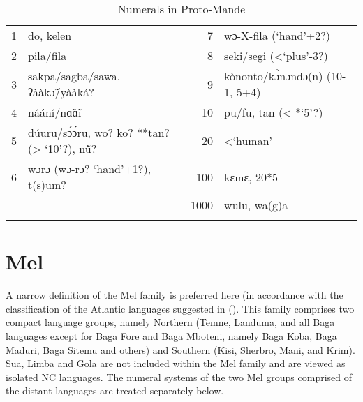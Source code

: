 \begin{table}
\caption{\label{tab:3:215}Numerals in Proto-Mande}


\begin{tabularx}{\textwidth}{lQrQ}
\lsptoprule

1 & do, kelen & 7 & wɔ-X-fila (‘hand’+2?)\\
2 & pila/fila & 8 & seki/segi (<‘plus’-3?)\\
3 & sakpa/sagba/sawa, ʔààk{\~{ɔ}}/yààká? & 9 & kònonto/k{\`{ɔ}}nɔndɔ(n) (10-1, 5+4)\\
4 & náání/n{\~{ɑ}}{\~{ɑ}}i & 10 & pu/fu, tan (< *‘5’?)\\
5 & d{\'{u}}uru/s{\'{ɔ}}{\'{ɔ}}ru, wo? ko? **tan? (> ‘10’?), n\~{\`{u}}? & 20 & <‘human’\\
6 & wɔrɔ (wɔ-rɔ? ‘hand’+1?), t(s)um? & 100 & kɛmɛ, 20*5\\
&  & 1000 & wulu, wa(g)a\\
\lspbottomrule
\end{tabularx}
\end{table}

\clearpage 
\section{Mel}%

A narrow definition of the Mel family is preferred here (in accordance with the classification of the Atlantic languages suggested in (\citealt{PozdniakovSegerer2017}). This family comprises two compact language groups, namely Northern (Temne, Landuma, and all Baga languages except for Baga Fore and Baga Mboteni, namely Baga Koba, Baga Maduri, Baga Sitemu and others) and Southern (Kisi, Sherbro, Mani, and Krim). Sua, Limba and Gola are not included within the Mel family and are viewed as isolated NC languages. The numeral systems of the two Mel groups comprised of the distant languages are treated separately below.

\clearpage
